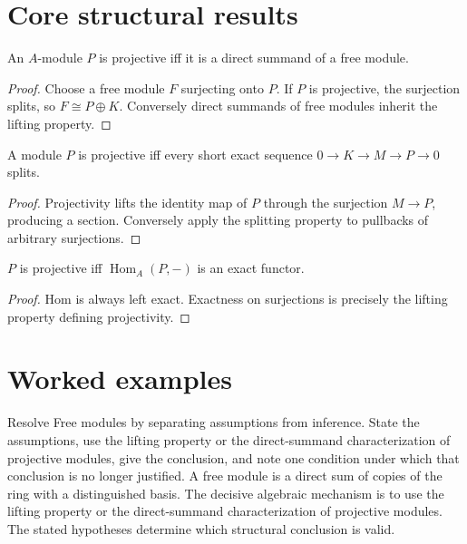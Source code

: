\section{Core structural results}

\begin{theorem}\label{thm:v13-01}
An $A$-module $P$ is projective iff it is a direct summand of a free module.
\begin{proof}
Choose a free module $F$ surjecting onto $P$. If $P$ is projective, the surjection splits, so $F\cong P\oplus K$. Conversely direct summands of free modules inherit the lifting property.
\end{proof}
\end{theorem}

\begin{theorem}\label{thm:v13-02}
A module $P$ is projective iff every short exact sequence $0\to K\to M\to P\to0$ splits.
\begin{proof}
Projectivity lifts the identity map of $P$ through the surjection $M\to P$, producing a section. Conversely apply the splitting property to pullbacks of arbitrary surjections.
\end{proof}
\end{theorem}

\begin{theorem}\label{thm:v13-03}
$P$ is projective iff $\operatorname{Hom}_A(P,-)$ is an exact functor.
\begin{proof}
Hom is always left exact. Exactness on surjections is precisely the lifting property defining projectivity.
\end{proof}
\end{theorem}

\section{Worked examples}

\begin{example}\label{ex:v13-worked-01}
Resolve Free modules by separating assumptions from inference. State the assumptions, use the lifting property or the direct-summand characterization of projective modules, give the conclusion, and note one condition under which that conclusion is no longer justified. A free module is a direct sum of copies of the ring with a distinguished basis. The decisive algebraic mechanism is to use the lifting property or the direct-summand characterization of projective modules. The stated hypotheses determine which structural conclusion is valid.
\end{example}

